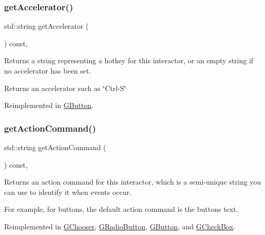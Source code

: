 \subsubsection{\texorpdfstring{get\+Accelerator()}{getAccelerator()}}
{\footnotesize\ttfamily std\+::string get\+Accelerator (\begin{DoxyParamCaption}{ }\end{DoxyParamCaption}) const\hspace{0.3cm}{\ttfamily [virtual]}, {\ttfamily [inherited]}}



Returns a string representing a hotkey for this interactor, or an empty string if no accelerator has been set. 

\begin{DoxyReturn}{Returns}
an accelerator such as \char`\"{}\+Ctrl-\/\+S\char`\"{} 
\end{DoxyReturn}


Reimplemented in \mbox{\hyperlink{classsgl_1_1GButton_a57806dc9defb73f76f493f8548319924}{G\+Button}}.

\mbox{\label{classsgl_1_1GInteractor_a94eb4276000c4fdfb508ce9e6317a82a}} 
\subsubsection{\texorpdfstring{get\+Action\+Command()}{getActionCommand()}}
{\footnotesize\ttfamily std\+::string get\+Action\+Command (\begin{DoxyParamCaption}{ }\end{DoxyParamCaption}) const\hspace{0.3cm}{\ttfamily [virtual]}, {\ttfamily [inherited]}}



Returns an action command for this interactor, which is a semi-\/unique string you can use to identify it when events occur. 

For example, for buttons, the default action command is the button\textquotesingle{}s text. 

Reimplemented in \mbox{\hyperlink{classsgl_1_1GChooser_a4f83505141da1f8446f0e0e0a9507930}{G\+Chooser}}, \mbox{\hyperlink{classsgl_1_1GRadioButton_a4f83505141da1f8446f0e0e0a9507930}{G\+Radio\+Button}}, \mbox{\hyperlink{classsgl_1_1GButton_a4f83505141da1f8446f0e0e0a9507930}{G\+Button}}, and \mbox{\hyperlink{classsgl_1_1GCheckBox_a4f83505141da1f8446f0e0e0a9507930}{G\+Check\+Box}}.


